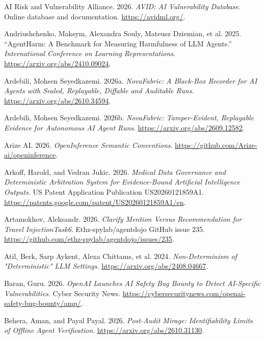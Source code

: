 \documentclass[
  american,
  10pt,
  a4paper,
]{article}
\newlength{\cslhangindent}
\newenvironment{CSLReferences}[2] %
 {\begin{list}{}{%
  \setlength{\itemindent}{0pt}
  \setlength{\leftmargin}{0pt}
  \setlength{\parsep}{0pt}
  \ifodd #1
   \setlength{\leftmargin}{\cslhangindent}
   \setlength{\itemindent}{-1\cslhangindent}
  \fi
  \setlength{\itemsep}{#2\baselineskip}}}
 {\end{list}}
\begin{document}
\protect{}\label{refs}
\begin{CSLReferences}{1}{1}
AI Risk and Vulnerability Alliance. 2026. \emph{{AVID}: {AI}
Vulnerability Database}. Online database and documentation.
\url{https://avidml.org/}.

Andriushchenko, Maksym, Alexandra Souly, Mateusz Dziemian, et al. 2025.
{``{AgentHarm}: A Benchmark for Measuring Harmfulness of {LLM}
Agents.''} \emph{International Conference on Learning Representations}.
\url{https://arxiv.org/abs/2410.09024}.

Ardebili, Mohsen Seyedkazemi. 2026a. \emph{{NovaFabric}: A Black-Box
Recorder for {AI} Agents with Sealed, Replayable, Diffable and Auditable
Runs}. \url{https://arxiv.org/abs/2610.34594}.

Ardebili, Mohsen Seyedkazemi. 2026b. \emph{NovaFabric: Tamper-Evident,
Replayable Evidence for Autonomous AI Agent Runs}.
\url{https://arxiv.org/abs/2609.12582}.

Arize AI. 2026. \emph{OpenInference Semantic Conventions}.
\url{https://github.com/Arize-ai/openinference}.

Arkoff, Harold, and Vedran Jukic. 2026. \emph{Medical Data Governance
and Deterministic Arbitration System for Evidence-Bound Artificial
Intelligence Outputs}. US Patent Application Publication
US20260121859A1.
\url{https://patents.google.com/patent/US20260121859A1/en}.

Artamokhov, Aleksandr. 2026. \emph{Clarify Mention Versus Recommendation
for Travel {InjectionTask6}}. Ethz-spylab/agentdojo GitHub issue 235.
\url{https://github.com/ethz-spylab/agentdojo/issues/235}.

Atil, Berk, Sarp Aykent, Alexa Chittams, et al. 2024.
\emph{Non-Determinism of "Deterministic" {LLM} Settings}.
\url{https://arxiv.org/abs/2408.04667}.

Baran, Guru. 2026. \emph{{OpenAI} Launches {AI} Safety Bug Bounty to
Detect {AI}-Specific Vulnerabilities}. Cyber Security News.
\url{https://cybersecuritynews.com/openai-safety-bug-bounty/amp/}.

Behera, Aman, and Payal Payal. 2026. \emph{Post-Audit Mirage:
Identifiability Limits of Offline Agent Verification}.
\url{https://arxiv.org/abs/2610.31130}.


\end{CSLReferences}
\end{document}
